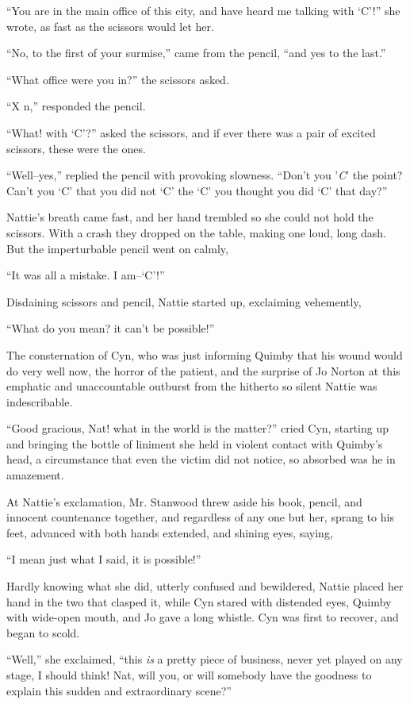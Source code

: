 ``You are in the main office of this city, and have heard me talking with
`C'!'' she wrote, as fast as the scissors would let her.

``No, to the first of your surmise,'' came from the pencil, ``and yes to
the last.''

``What office were you in?'' the scissors asked.

``X n,'' responded the pencil.

``What! with `C'?'' asked the scissors, and if ever there was a pair of
excited scissors, these were the ones.

``Well--yes,'' replied the pencil with provoking slowness. ``Don't you
'\emph{C}' the point? Can't you `C' that you did not `C' the `C' you thought
you did `C' that day?''

Nattie's breath came fast, and her hand trembled so she could not hold
the scissors. With a crash they dropped on the table, making one loud,
long dash. But the imperturbable pencil went on calmly,

``It was all a mistake. I am--`C'!''

Disdaining scissors and pencil, Nattie started up, exclaiming
vehemently,

``What do you mean? it can't be possible!''

The consternation of Cyn, who was just informing Quimby that his wound
would do very well now, the horror of the patient, and the surprise of
Jo Norton at this emphatic and unaccountable outburst from the hitherto
so silent Nattie was indescribable.

``Good gracious, Nat! what in the world is the matter?'' cried Cyn,
starting up and bringing the bottle of liniment she held in violent
contact with Quimby's head, a circumstance that even the victim did not
notice, so absorbed was he in amazement.

At Nattie's exclamation, Mr. Stanwood threw aside his book, pencil, and
innocent countenance together, and regardless of any one but her, sprang
to his feet, advanced with both hands extended, and shining eyes,
saying,

``I mean just what I said, it is possible!''

Hardly knowing what she did, utterly confused and bewildered, Nattie
placed her hand in the two that clasped it, while Cyn stared with
distended eyes, Quimby with wide-open mouth, and Jo gave a long whistle.
Cyn was first to recover, and began to scold.

``Well,'' she exclaimed, ``this \emph{is} a pretty piece of business, never yet
played on any stage, I should think! Nat, will you, or will somebody
have the goodness to explain this sudden and extraordinary scene?''

